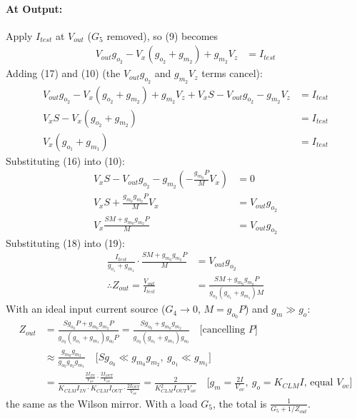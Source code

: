 \begin{enumerate}
    \paragraph{At Output:} Apply \(I_{test}\) at \(V_{out}\) (\(G_5\) removed),
      so (9) becomes
      \begin{align*}
        V_{out} g_{o_2} - V_{x}(g_{o_2} + g_{m_2}) + g_{m_2}V_{z} &= I_{test} \tag{17}
      \end{align*}
      Adding (17) and (10) (the \(V_{out} g_{o_2}\) and \(g_{m_2} V_z\) terms cancel):
      \begin{align*}
        V_{out} g_{o_2} - V_{x}(g_{o_2} + g_{m_2}) + g_{m_2}V_{z} + V_{x} S - V_{out}g_{o_2} - g_{m_2}V_{z} &= I_{test} \\
        V_{x} S - V_{x}(g_{o_2} + g_{m_2}) &= I_{test} \\
        V_{x} (g_{o_1} + g_{m_1}) &= I_{test} \tag{18}
      \end{align*}
      Substituting (16) into (10):
      \begin{align*}
        V_{x} S - V_{out} g_{o_2} - g_{m_2}\left(-\frac{g_{m_0} P}{M} V_{x}\right) &= 0 \\
        V_{x} S + \frac{g_{m_0} g_{m_2} P}{M} V_{x} &= V_{out} g_{o_2} \\
        V_{x} \frac{S M + g_{m_0} g_{m_2} P}{M} &= V_{out} g_{o_2} \tag{19}
      \end{align*}
      Substituting (18) into (19):
      \begin{align*}
        \frac{I_{test}}{g_{o_1} + g_{m_1}} \cdot \frac{S M + g_{m_0} g_{m_2} P}{M} &= V_{out} g_{o_2} \\
        \therefore Z_{out} = \frac{V_{out}}{I_{test}} &= \frac{S M + g_{m_0} g_{m_2} P}{g_{o_2} (g_{o_1} + g_{m_1}) M}
      \end{align*}
      With an ideal input current source (\(G_4 \to 0\), \(M = g_{o_0} P\))
      and \(g_m \gg g_o\):
      \begin{align*}
        Z_{out} &= \frac{S g_{o_0} P + g_{m_0} g_{m_2} P}{g_{o_2}(g_{o_1} + g_{m_1}) g_{o_0} P}
                 = \frac{S g_{o_0} + g_{m_0} g_{m_2}}{g_{o_2}(g_{o_1} + g_{m_1}) g_{o_0}} \quad \text{[cancelling } P \text{]} \\
                &\approx \frac{g_{m_0} g_{m_2}}{g_{o_0} g_{o_2} g_{m_1}} \quad \text{[} S g_{o_0} \ll g_{m_0} g_{m_2},\ g_{o_1} \ll g_{m_1} \text{]} \\
                &= \frac{\frac{2I_{IN}}{V_{ov}} \cdot \frac{2I_{OUT}}{V_{ov}}}{K_{CLM} I_{IN} \cdot K_{CLM} I_{OUT} \cdot \frac{2I_{OUT}}{V_{ov}}}
                 = \frac{2}{K_{CLM}^2 I_{OUT} V_{ov}} \quad \text{[} g_m = \tfrac{2I}{V_{ov}},\ g_o = K_{CLM} I \text{, equal } V_{ov} \text{]}
      \end{align*}
      the same as the Wilson mirror.
      With a load \(G_5\), the total is \(\frac{1}{G_5 + 1/Z_{out}}\).

\end{enumerate}
